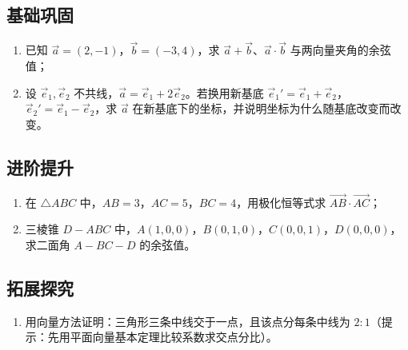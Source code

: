 \begin{afterclass}
\subsection*{基础巩固}
\begin{enumerate}
  \item 已知 $\vec a=(2,-1)$，$\vec b=(-3,4)$，求 $\vec a+\vec b$、$\vec a\cdot\vec b$ 与两向量夹角的余弦值；
  \item 设 $\vec e_1,\vec e_2$ 不共线，$\vec a=\vec e_1+2\vec e_2$。若换用新基底 $\vec e_1'=\vec e_1+\vec e_2$，$\vec e_2'=\vec e_1-\vec e_2$，求 $\vec a$ 在新基底下的坐标，并说明坐标为什么随基底改变而改变。
\end{enumerate}

\subsection*{进阶提升}
\begin{enumerate}
  \item 在 $\triangle ABC$ 中，$AB=3$，$AC=5$，$BC=4$，用极化恒等式求 $\overrightarrow{AB}\cdot\overrightarrow{AC}$；
  \item 三棱锥 $D-ABC$ 中，$A(1,0,0)$，$B(0,1,0)$，$C(0,0,1)$，$D(0,0,0)$，求二面角 $A-BC-D$ 的余弦值。
\end{enumerate}

\subsection*{拓展探究}
\begin{enumerate}
  \item 用向量方法证明：三角形三条中线交于一点，且该点分每条中线为 $2:1$（提示：先用平面向量基本定理比较系数求交点分比）。
\end{enumerate}


\end{afterclass}
